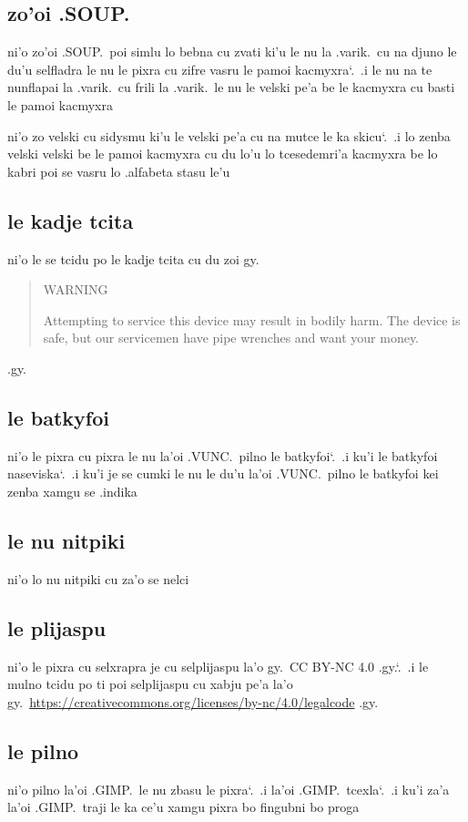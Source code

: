 \documentclass{report}
\newcommand\sds{\spacefactor\sfcode`.\ \space}
\begin{document}
\subsection{zo'oi .SOUP.}
ni'o zo'oi .SOUP.\ poi simlu lo bebna cu zvati ki'u le nu la .varik.\ cu na djuno le du'u selfladra le nu le pixra cu zifre vasru le pamoi kacmyxra\sds  .i le nu na te nunflapai la .varik.\ cu frili la .varik.\ le nu le velski pe'a be le kacmyxra cu basti le pamoi kacmyxra

ni'o zo velski cu sidysmu ki'u le velski pe'a cu na mutce le ka skicu\sds  .i lo zenba velski velski be le pamoi kacmyxra cu du lo'u lo tcesedemri'a kacmyxra be lo kabri poi se vasru lo .alfabeta stasu le'u

\subsection{le kadje tcita}
ni'o le se tcidu po le kadje tcita cu du zoi gy.
\begin{quote}
	WARNING

	Attempting to service this device may result in bodily harm.  The device is safe, but our servicemen have pipe wrenches and want your money.
\end{quote}
.gy.

\subsection{le batkyfoi}
ni'o le pixra cu pixra le nu la'oi .VUNC.\ pilno le batkyfoi\sds  .i ku'i le batkyfoi naseviska\sds  .i ku'i je se cumki le nu le du'u la'oi .VUNC.\ pilno le batkyfoi kei zenba xamgu se .indika

\subsection{le nu nitpiki}
ni'o lo nu nitpiki cu za'o se nelci

\subsection{le plijaspu}
ni'o le pixra cu selxrapra je cu selplijaspu la'o gy.\ CC BY-NC 4.0 .gy.\sds  .i le mulno tcidu po ti poi selplijaspu cu xabju pe'a la'o gy.\ \url{https://creativecommons.org/licenses/by-nc/4.0/legalcode} .gy.

\subsection{le pilno}
ni'o pilno la'oi .GIMP.\ le nu zbasu le pixra\sds  .i la'oi .GIMP.\ tcexla\sds  .i ku'i za'a la'oi .GIMP.\ traji le ka ce'u xamgu pixra bo fingubni bo proga
\end{document}
